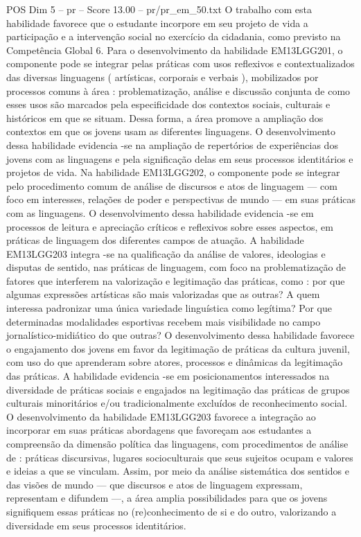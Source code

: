 \begin{textsample}{POS Dim 5 – pr – Score 13.00 – pr/pr\_em\_50.txt}
O trabalho com esta habilidade favorece que o estudante incorpore em seu projeto de vida a participação e a intervenção social no exercício da cidadania, como previsto na Competência Global 6.
Para o desenvolvimento da habilidade EM13LGG201, o componente pode se integrar pelas práticas com usos reflexivos e contextualizados das diversas linguagens ( artísticas, corporais e verbais ), mobilizados por processos comuns à área : problematização, análise e discussão conjunta de como esses usos são marcados pela especificidade dos contextos sociais, culturais e históricos em que se situam.
Dessa forma, a área promove a ampliação dos contextos em que os jovens usam as diferentes linguagens.
O desenvolvimento dessa habilidade evidencia -se na ampliação de repertórios de experiências dos jovens com as linguagens e pela significação delas em seus processos identitários e projetos de vida.
Na habilidade EM13LGG202, o componente pode se integrar pelo procedimento comum de análise de discursos e atos de linguagem — com foco em interesses, relações de poder e perspectivas de mundo — em suas práticas com as linguagens.
O desenvolvimento dessa habilidade evidencia -se em processos de leitura e apreciação críticos e reflexivos sobre esses aspectos, em práticas de linguagem dos diferentes campos de atuação.
A habilidade EM13LGG203 integra -se na qualificação da análise de valores, ideologias e disputas de sentido, nas práticas de linguagem, com foco na problematização de fatores que interferem na valorização e legitimação das práticas, como : por que algumas expressões artísticas são mais valorizadas que as outras?
A quem interessa padronizar uma única variedade linguística como legítima?
Por que determinadas modalidades esportivas recebem mais visibilidade no campo jornalístico-midiático do que outras?
O desenvolvimento dessa habilidade favorece o engajamento dos jovens em favor da legitimação de práticas da cultura juvenil, com uso do que aprenderam sobre atores, processos e dinâmicas da legitimação das práticas.
A habilidade evidencia -se em posicionamentos interessados na diversidade de práticas sociais e engajados na legitimação das práticas de grupos culturais minoritários e/ou tradicionalmente excluídos de reconhecimento social.
O desenvolvimento da habilidade EM13LGG203 favorece a integração ao incorporar em suas práticas abordagens que favoreçam aos estudantes a compreensão da dimensão política das linguagens, com procedimentos de análise de : práticas discursivas, lugares socioculturais que seus sujeitos ocupam e valores e ideias a que se vinculam.
Assim, por meio da análise sistemática dos sentidos e das visões de mundo — que discursos e atos de linguagem expressam, representam e difundem —, a área amplia possibilidades para que os jovens signifiquem essas práticas no (re)conhecimento de si e do outro, valorizando a diversidade em seus processos identitários.

\end{textsample}
